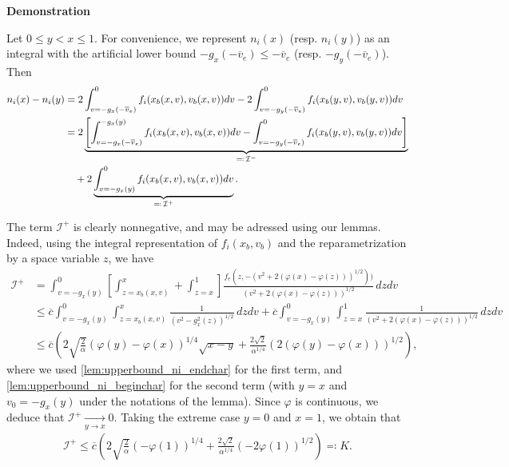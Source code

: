 \documentclass{article}
\numberwithin{equation}{section}
\newcommand{\myproof}[1]{
	\noindent \textbf{Demonstration}
	{\small	#1 \hfill \qedsymbol}
}
\newcommand{\ve}{{\overline{v}_e}} %
\newcommand{\maxfe}{{\overline{c}}} %
\begin{document}
\myproof{
	Let $0 \leqslant y < x \leqslant 1$. For convenience, we represent $n_i(x)$ (resp. $n_i(y)$) as an integral with the artificial lower bound $-g_x(-\ve) \leqslant -\ve$ (resp. $-g_y(-\ve)$). Then
	\begin{align}\label{eq:def_ni_sym}
		n_i(x) - n_i(y) 
		&= 2 \int_{v=-g_x(-\ve)}^0 f_i(x_b(x,v),v_b(x,v)) dv - 2 \int_{v=-g_y(-\ve)}^0 f_i(x_b(y,v),v_b(y,v)) dv \notag\\
		&= 2 \underbrace{\left[\int_{v=-g_x(-\ve)}^{-g_x(y)} f_i(x_b(x,v),v_b(x,v)) dv - \int_{v=-g_y(-\ve)}^{0} f_i(x_b(y,v),v_b(y,v)) dv\right]}_{\eqqcolon\,\mathcal{I}^-} \\
		&\quad + 2 \underbrace{\int_{v=-g_x(y)}^{0} f_i(x_b(x,v),v_b(x,v)) dv}_{\eqqcolon\,\mathcal{I}^+}. \notag
	\end{align}

	The term $\mathcal{I}^+$ is clearly nonnegative, and may be adressed using our lemmas. Indeed, using the integral representation of $f_i(x_b,v_b)$ and the reparametrization by a space variable $z$, we have
	\begin{align*}
		\mathcal{I}^+ 
		&= \int_{v=-g_x(y)}^{0} \left[\int_{z=x_b(x,v)}^{x} + \int_{z=x}^{1}\right] \frac{f_e(z,-\left(v^2+2\left(\varphi(x)-\varphi(z)\right)\right)^{1/2}))}{\left(v^2+2\left(\varphi(x)-\varphi(z)\right)\right)^{1/2}} \,dz dv \\
		&\leqslant \maxfe \int_{v=-g_x(y)}^{0} \int_{z=x_b(x,v)}^{x} \frac{1}{\left(v^2-g_x^2(z)\right)^{1/2}} \, dz dv + \maxfe \int_{v=-g_x(y)}^{0} \int_{z=x}^{1} \frac{1}{\left(v^2+2\left(\varphi(x)-\varphi(z)\right)\right)^{1/2}} \,dz dv \\
		&\leqslant \maxfe \left(2\sqrt{\frac{2}{\alpha}} \left(\varphi(y)-\varphi(x)\right)^{1/4} \sqrt{x-y} + \frac{2\sqrt{2}}{\alpha^{1/4}} \left(2(\varphi(y)-\varphi(x))\right)^{1/2}\right),
	\end{align*}
	where we used \cref{lem:upperbound_ni_endchar} for the first term, and \cref{lem:upperbound_ni_beginchar} for the second term (with $y=x$ and $v_0 = -g_x(y)$ under the notations of the lemma). Since $\varphi$ is continuous, we deduce that $\mathcal{I}^{+} \underset{y\to x}{\longrightarrow} 0$. Taking the extreme case $y=0$ and $x=1$, we obtain that 
	\begin{align*}
		\mathcal{I}^+ \leqslant \maxfe \left(2\sqrt{\frac{2}{\alpha}} \left(-\varphi(1)\right)^{1/4} + \frac{2\sqrt{2}}{\alpha^{1/4}} \left(-2\varphi(1)\right)^{1/2}\right) \eqqcolon K.
	\end{align*}

}
\end{document}
